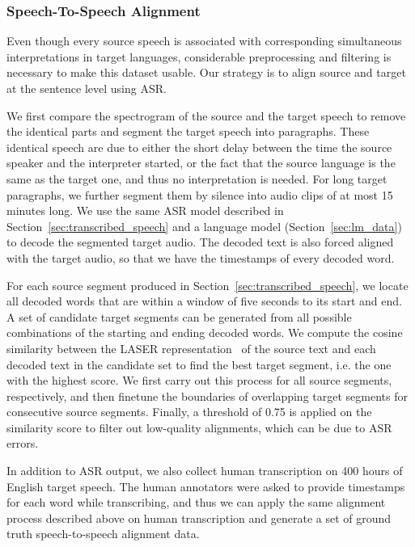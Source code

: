 \documentclass[11pt,a4paper]{article}
\begin{document}
\subsubsection{Speech-To-Speech Alignment}
Even though every source speech is associated with corresponding simultaneous interpretations in target languages, considerable preprocessing and filtering is necessary to make this dataset usable. Our strategy is to align source and target at the sentence level using ASR.

We first compare the spectrogram of the source and the target speech to remove the identical parts and segment the target speech into paragraphs. These identical speech are due to either the short delay between the time the source speaker and the interpreter started, or the fact that the source language is the same as the target one, and thus no interpretation is needed. For long target paragraphs, we further segment them by silence into audio clips of at most 15 minutes long. We use the same ASR model described in Section~\ref{sec:transcribed_speech} and a language model (Section~\ref{sec:lm_data}) to decode the segmented target audio. The decoded text is also forced aligned with the target audio, so that we have the timestamps of every decoded word. 

For each source segment produced in Section~\ref{sec:transcribed_speech}, we locate all decoded words that are within a window of five seconds to its start and end. A set of candidate target segments can be generated from all possible combinations of the starting and ending decoded words. We compute the cosine similarity between the LASER representation~\citep{artetxe2019massively} of the source text and each decoded text in the candidate set to find the best target segment, i.e. the one with the highest score. We first carry out this process for all source segments, respectively, and then finetune the boundaries of overlapping target segments for consecutive source segments. Finally, a threshold of 0.75 is applied on the similarity score to filter out low-quality alignments, which can be due to ASR errors.

In addition to ASR output, we also collect human transcription on 400 hours of English target speech. The human annotators were asked to provide timestamps for each word while transcribing, and thus we can apply the same alignment process described above on human transcription and generate a set of ground truth speech-to-speech alignment data.
\end{document}
